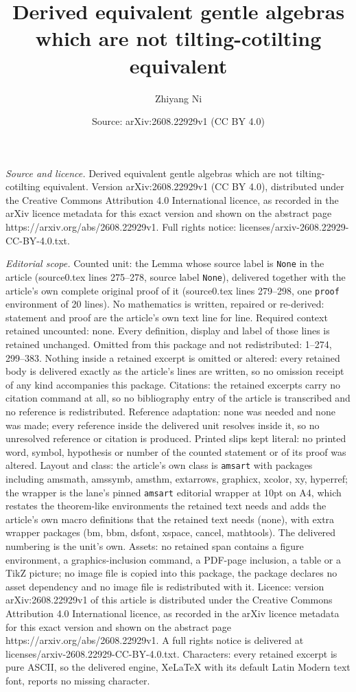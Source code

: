 \documentclass[10pt,a4paper]{amsart}
\title[Derived equivalent gentle algebras which are not tilting-cot]{Derived equivalent gentle algebras which are not tilting-cotilting equivalent}
\author{Zhiyang Ni}
\date{Source: arXiv:2608.22929v1 (CC BY 4.0)}
\begin{document}
\maketitle

\noindent\emph{Source and licence.} Derived equivalent gentle algebras which are not tilting-cotilting equivalent. Version arXiv:2608.22929v1 (CC BY 4.0), distributed under the Creative Commons Attribution 4.0 International licence, as recorded in the arXiv licence metadata for this exact version and shown on the abstract page https://arxiv.org/abs/2608.22929v1. Full rights notice: licenses/arxiv-2608.22929-CC-BY-4.0.txt.\par\smallskip

\noindent\textit{Editorial scope.} Counted unit: the Lemma whose source label is \texttt{None} in the article (source0.tex lines 275--278, source label \texttt{None}), delivered together with the article's own complete original proof of it (source0.tex lines 279--298, one \texttt{proof} environment of 20 lines). No mathematics is written, repaired or re-derived: statement and proof are the article's own text line for line. Required context retained uncounted: none. Every definition, display and label of those lines is retained unchanged. Omitted from this package and not redistributed: 1--274, 299--383. Nothing inside a retained excerpt is omitted or altered: every retained body is delivered exactly as the article's lines are written, so no omission receipt of any kind accompanies this package. Citations: the retained excerpts carry no citation command at all, so no bibliography entry of the article is transcribed and no reference is redistributed. Reference adaptation: none was needed and none was made; every reference inside the delivered unit resolves inside it, so no unresolved reference or citation is produced. Printed slips kept literal: no printed word, symbol, hypothesis or number of the counted statement or of its proof was altered. Layout and class: the article's own class is \texttt{amsart} with packages including amsmath, amssymb, amsthm, extarrows, graphicx, xcolor, xy, hyperref; the wrapper is the lane's pinned \texttt{amsart} editorial wrapper at 10pt on A4, which restates the theorem-like environments the retained text needs and adds the article's own macro definitions that the retained text needs (none), with extra wrapper packages (bm, bbm, dsfont, xspace, cancel, mathtools). The delivered numbering is the unit's own. Assets: no retained span contains a figure environment, a graphics-inclusion command, a PDF-page inclusion, a table or a TikZ picture; no image file is copied into this package, the package declares no asset dependency and no image file is redistributed with it. Licence: version arXiv:2608.22929v1 of this article is distributed under the Creative Commons Attribution 4.0 International licence, as recorded in the arXiv licence metadata for this exact version and shown on the abstract page https://arxiv.org/abs/2608.22929v1. A full rights notice is delivered at licenses/arxiv-2608.22929-CC-BY-4.0.txt. Characters: every retained excerpt is pure ASCII, so the delivered engine, XeLaTeX with its default Latin Modern text font, reports no missing character.
\end{document}
